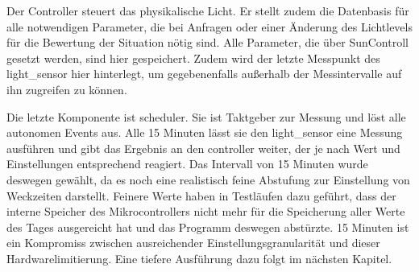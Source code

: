 Der Controller steuert das physikalische Licht. Er stellt zudem die Datenbasis für alle notwendigen Parameter, die bei Anfragen oder einer Änderung des Lichtlevels für die Bewertung der Situation nötig sind. Alle Parameter, die über SunControll gesetzt werden, sind hier gespeichert. Zudem wird der letzte Messpunkt des light\_sensor hier hinterlegt, um gegebenenfalls außerhalb der Messintervalle auf ihn zugreifen zu können.

Die letzte Komponente ist scheduler. Sie ist Taktgeber zur Messung und löst alle autonomen Events aus. Alle 15 Minuten lässt sie den light\_sensor eine Messung ausführen und gibt das Ergebnis an den controller weiter, der je nach Wert und Einstellungen entsprechend reagiert. Das Intervall von 15 Minuten wurde deswegen gewählt, da es noch eine realistisch feine Abstufung zur Einstellung von Weckzeiten darstellt. Feinere Werte haben in Testläufen dazu geführt, dass der interne Speicher des Mikrocontrollers nicht mehr für die Speicherung aller Werte des Tages ausgereicht hat und das Programm deswegen abstürzte. 15 Minuten ist ein Kompromiss zwischen ausreichender Einstellungsgranularität und dieser Hardwarelimitierung. Eine tiefere Ausführung dazu folgt im nächsten Kapitel. 






